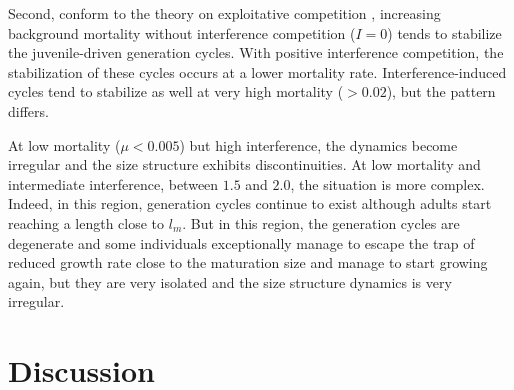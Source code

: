 Second, conform to the theory on exploitative competition
\autocite{de-roos1997a}, increasing background mortality without interference
competition ($I = 0$) tends to stabilize the juvenile-driven generation cycles.
With positive interference competition, the stabilization of these cycles occurs
at a lower mortality rate.
Interference-induced cycles tend to stabilize as well at very high mortality
($>0.02$), but the pattern differs.

At low mortality ($\mu<0.005$) but high interference, the dynamics become
irregular and the size structure exhibits discontinuities. At low mortality and
intermediate interference, between $1.5$ and $2.0$, the situation is more
complex. Indeed, in this region, generation cycles continue to exist although
adults start reaching a length close to $l_m$. But in this region, the
generation cycles are degenerate and some individuals exceptionally manage to
escape the trap of reduced growth rate close to the maturation size and manage
to start growing again, but they are very isolated and the size structure
dynamics is very irregular.

\section{Discussion}

